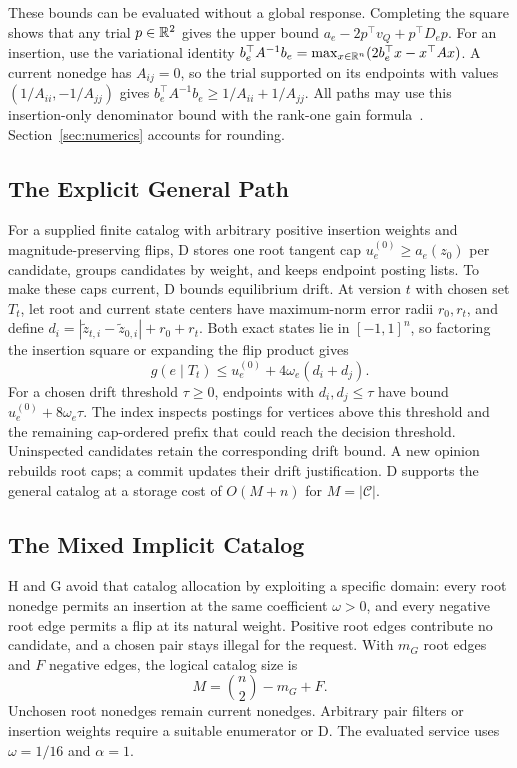 These bounds can be evaluated without a global response. Completing the square shows that any trial $p\in\mathbb R^2$ gives the upper bound $a_e-2p^\top v_Q+p^\top D_ep$. For an insertion, use the variational identity $b_e^\top A^{-1}b_e=\max_{x\in\mathbb R^n}(2b_e^\top x-x^\top Ax)$. A current nonedge has $A_{ij}=0$, so the trial supported on its endpoints with values $(1/A_{ii},-1/A_{jj})$ gives $b_e^\top A^{-1}b_e\ge1/A_{ii}+1/A_{jj}$. All paths may use this insertion-only denominator bound with the rank-one gain formula~\cite{bhalla2023local}. Section~\ref{sec:numerics} accounts for rounding.

\subsection{The Explicit General Path}
For a supplied finite catalog with arbitrary positive insertion weights and magnitude-preserving flips, D stores one root tangent cap $u_e^{(0)}\ge a_e(z_0)$ per candidate, groups candidates by weight, and keeps endpoint posting lists. To make these caps current, D bounds equilibrium drift. At version $t$ with chosen set $T_t$, let root and current state centers have maximum-norm error radii $r_0,r_t$, and define $d_i=|\widetilde z_{t,i}-\widetilde z_{0,i}|+r_0+r_t$. Both exact states lie in $[-1,1]^n$, so factoring the insertion square or expanding the flip product gives
\begin{equation}
 g(e\mid T_t)\le u_e^{(0)}+4\omega_e(d_i+d_j).
 \label{eq:drift}
\end{equation}
For a chosen drift threshold $\tau\ge0$, endpoints with $d_i,d_j\le\tau$ have bound $u_e^{(0)}+8\omega_e\tau$. The index inspects postings for vertices above this threshold and the remaining cap-ordered prefix that could reach the decision threshold. Uninspected candidates retain the corresponding drift bound. A new opinion rebuilds root caps; a commit updates their drift justification. D supports the general catalog at a storage cost of $O(M+n)$ for $M=|\mathcal C|$.

\subsection{The Mixed Implicit Catalog}
H and G avoid that catalog allocation by exploiting a specific domain: every root nonedge permits an insertion at the same coefficient $\omega>0$, and every negative root edge permits a flip at its natural weight. Positive root edges contribute no candidate, and a chosen pair stays illegal for the request. With $m_G$ root edges and $F$ negative edges, the logical catalog size is
\begin{equation}
 M=\binom n2-m_G+F.
 \label{eq:catalog-size}
\end{equation}
Unchosen root nonedges remain current nonedges. Arbitrary pair filters or insertion weights require a suitable enumerator or D. The evaluated service uses $\omega=1/16$ and $\alpha=1$.

